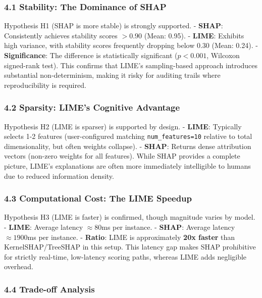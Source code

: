 \documentclass[
]{article}
\begin{document}
\hypertarget{stability-the-dominance-of-shap}{%
\subsubsection{4.1 Stability: The Dominance of
SHAP}\label{stability-the-dominance-of-shap}}

Hypothesis H1 (SHAP is more stable) is strongly supported. -
\textbf{SHAP}: Consistently achieves stability scores \(> 0.90\) (Mean:
0.95). - \textbf{LIME}: Exhibits high variance, with stability scores
frequently dropping below 0.30 (Mean: 0.24). - \textbf{Significance}:
The difference is statistically significant (\(p < 0.001\), Wilcoxon
signed-rank test). This confirms that LIME's sampling-based approach
introduces substantial non-determinism, making it risky for auditing
trails where reproducibility is required.

\hypertarget{sparsity-limes-cognitive-advantage}{%
\subsubsection{4.2 Sparsity: LIME's Cognitive
Advantage}\label{sparsity-limes-cognitive-advantage}}

Hypothesis H2 (LIME is sparser) is supported by design. - \textbf{LIME}:
Typically selects 1-2 features (user-configured matching
\texttt{num\_features=10} relative to total dimensionality, but often
weights collapse). - \textbf{SHAP}: Returns dense attribution vectors
(non-zero weights for all features). While SHAP provides a complete
picture, LIME's explanations are often more immediately intelligible to
humans due to reduced information density.

\hypertarget{computational-cost-the-lime-speedup}{%
\subsubsection{4.3 Computational Cost: The LIME
Speedup}\label{computational-cost-the-lime-speedup}}

Hypothesis H3 (LIME is faster) is confirmed, though magnitude varies by
model. - \textbf{LIME}: Average latency \(\approx 80\)ms per instance. -
\textbf{SHAP}: Average latency \(\approx 1900\)ms per instance. -
\textbf{Ratio}: LIME is approximately \textbf{20x faster} than
KernelSHAP/TreeSHAP in this setup. This latency gap makes SHAP
prohibitive for strictly real-time, low-latency scoring paths, whereas
LIME adds negligible overhead.

\hypertarget{trade-off-analysis}{%
\subsubsection{4.4 Trade-off Analysis}\label{trade-off-analysis}}
\end{document}
